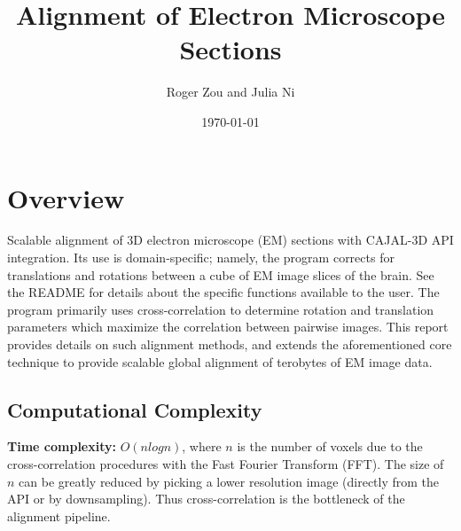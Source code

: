 \documentclass{article}
\author{Roger Zou and Julia Ni}
\date{\today}
\title{Alignment of Electron Microscope Sections}
\begin{document}
  
\maketitle

\section{Overview}
Scalable alignment of 3D electron microscope (EM) sections with CAJAL-3D API integration. Its use is domain-specific; namely, the program corrects for translations and rotations between a cube of EM image slices of the brain. See the README for details about the specific functions available to the user. The program primarily uses cross-correlation to determine rotation and translation parameters which maximize the correlation between pairwise images. This report provides details on such alignment methods, and extends the aforementioned core technique to provide scalable global alignment of terobytes of EM image data.

\subsection{Computational Complexity}
\textbf{Time complexity:} $O(nlogn)$, where $n$ is the number of voxels due to the cross-correlation procedures with the Fast Fourier Transform (FFT). The size of $n$ can be greatly reduced by picking a lower resolution image (directly from the API or by downsampling). Thus cross-correlation is the bottleneck of the alignment pipeline.
\end{document}
